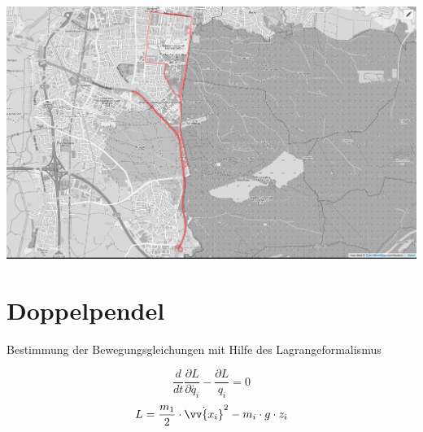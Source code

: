 \documentclass[compress,11pt]{beamer}
\begin{document}
\begin{frame}
	\includegraphics[width=\textwidth]{images/3/karte.png}
\end{frame}


\section{Doppelpendel}
\begin{frame}{Bestimmung der Bewegungsgleichungen mit Hilfe des Lagrangeformalismus}
	\begin{block}
		
		\begin{equation}
			\frac{d}{dt}\frac{\partial L}{\partial\dot{q_i}}-\frac{\partial L}{q_i} =0
		\label{lagrangegl}
		\end{equation}
		\begin{equation}
			 L=\frac{m_1}{2}\cdot\dot{\vv{x_i}}^2 - m_i \cdot g \cdot z_i
		\end{equation}
	\end{block}
\end{frame}
\end{document}

